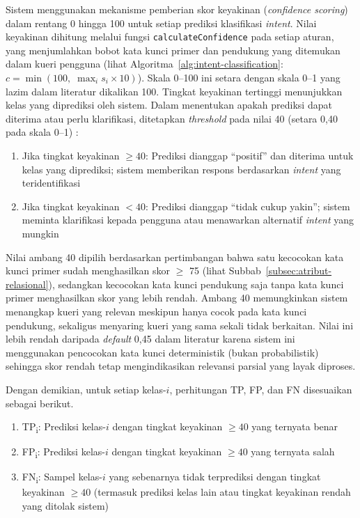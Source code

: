 Sistem menggunakan mekanisme pemberian skor keyakinan (\textit{confidence scoring}) dalam rentang 0 hingga 100 untuk setiap prediksi klasifikasi \textit{intent}. Nilai keyakinan dihitung melalui fungsi \texttt{calculateConfidence} pada setiap aturan, yang menjumlahkan bobot kata kunci primer dan pendukung yang ditemukan dalam kueri pengguna (lihat Algoritma~\ref{alg:intent-classification}: $c = \min(100,\;\max_{i} s_i \times 10)$). Skala 0--100 ini setara dengan skala 0--1 yang lazim dalam literatur dikalikan 100. Tingkat keyakinan tertinggi menunjukkan kelas yang diprediksi oleh sistem. Dalam menentukan apakah prediksi dapat diterima atau perlu klarifikasi, ditetapkan \textit{threshold} pada nilai 40 (setara 0{,}40 pada skala 0--1) \autocite{Santosa2025IndoBERTIntent}:

\begin{enumerate}[label=\alph*.]
    \item Jika tingkat keyakinan \(\geq 40\): Prediksi dianggap ``positif'' dan diterima untuk kelas yang diprediksi; sistem memberikan respons berdasarkan \textit{intent} yang teridentifikasi

    \item Jika tingkat keyakinan \(< 40\): Prediksi dianggap ``tidak cukup yakin''; sistem meminta klarifikasi kepada pengguna atau menawarkan alternatif \textit{intent} yang mungkin
\end{enumerate}

Nilai ambang 40 dipilih berdasarkan pertimbangan bahwa satu kecocokan kata kunci primer sudah menghasilkan skor $\geq$ 75 (lihat Subbab~\ref{subsec:atribut-relasional}), sedangkan kecocokan kata kunci pendukung saja tanpa kata kunci primer menghasilkan skor yang lebih rendah. Ambang 40 memungkinkan sistem menangkap kueri yang relevan meskipun hanya cocok pada kata kunci pendukung, sekaligus menyaring kueri yang sama sekali tidak berkaitan. Nilai ini lebih rendah daripada \textit{default} 0{,}45 dalam literatur \autocite{hengst2024conformal} karena sistem ini menggunakan pencocokan kata kunci deterministik (bukan probabilistik) sehingga skor rendah tetap mengindikasikan relevansi parsial yang layak diproses.

Dengan demikian, untuk setiap kelas-\(i\), perhitungan TP, FP, dan FN disesuaikan sebagai berikut.

\begin{enumerate}[label=\alph*.]
    \item TP\textsubscript{i}: Prediksi kelas-\(i\) dengan tingkat keyakinan \(\geq 40\) yang ternyata benar

    \item FP\textsubscript{i}: Prediksi kelas-\(i\) dengan tingkat keyakinan \(\geq 40\) yang ternyata salah

    \item FN\textsubscript{i}: Sampel kelas-\(i\) yang sebenarnya tidak terprediksi dengan tingkat keyakinan \(\geq 40\) (termasuk prediksi kelas lain atau tingkat keyakinan rendah yang ditolak sistem)
\end{enumerate}

